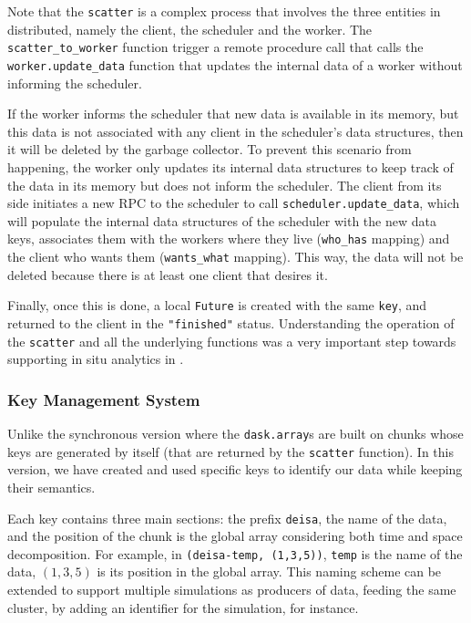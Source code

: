 Note that the \texttt{scatter} is a complex process that involves the three entities in \dask distributed, namely the client, the scheduler and the worker. The \texttt{scatter\_to\_worker} function trigger a remote procedure call that calls the \texttt{worker.update\_data} function that updates the internal data of a worker without informing the scheduler.

If the worker informs the scheduler that new data is available in its memory, but this data is not associated with any client in the scheduler's data structures, then it will be deleted by the garbage collector. 
To prevent this scenario from happening, the worker only updates its internal data structures to keep track of the data in its memory but does not inform the scheduler.
The client from its side initiates a new RPC to the scheduler to call \texttt{scheduler.update\_data}, which will populate the internal data structures of the scheduler with the new data keys, associates them with the workers where they live (\texttt{who\_has} mapping) and the client who wants them (\texttt{wants\_what} mapping). This way, the data will not be deleted because there is at least one client that desires it.

Finally, once this is done, a local \texttt{Future} is created with the same \texttt{key}, and returned to the client in the \texttt{"finished"} status. 
Understanding the operation of the \texttt{scatter} and all the underlying functions was a very important step towards supporting in situ analytics in \dask. 

\subsubsection{\deisa Key Management System}
Unlike the synchronous version where the \texttt{dask.array}s are built on chunks whose keys are generated by \dask itself (that are returned by the \texttt{scatter} function). In this version, we have created and used specific keys to identify our data while keeping their semantics. 

Each key contains three main sections:  the prefix \texttt{deisa}, the name of the data, and the position of the chunk is the global array considering both time and space decomposition. For example, in  \texttt{(deisa-temp, (1,3,5))}, \texttt{temp} is the name of the data, $(1,3,5)$ is its position in the global array. This naming scheme can be extended to support multiple simulations as producers of data, feeding the same \dask cluster, by adding an identifier for the simulation, for instance. 

